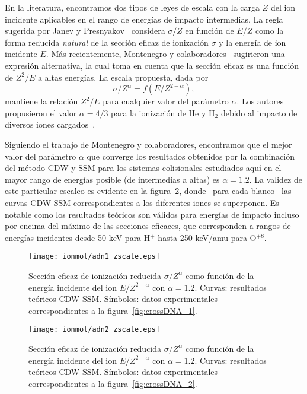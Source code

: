 En la literatura, encontramos dos tipos de leyes de escala con la carga 
$Z$ del ion incidente aplicables en el rango de energías de impacto
intermedias. La regla sugerida por Janev y Presnyakov~\cite{janev1980} 
considera $\sigma/Z$ en función de $E/Z$ como la forma reducida 
\textit{natural} de la sección eficaz de ionización $\sigma$ y la energía
de ion incidente $E$. Más recientemente, Montenegro y 
colaboradores~\cite{dubois2013,montenegro_pra13} sugirieron una expresión
alternativa, la cual toma en cuenta que la sección eficaz es una función
de $Z^2/E$ a altas energías. La escala propuesta, dada por
\begin{equation}
 \sigma/Z^{\alpha}=f(E/Z^{2-\alpha}),
\label{eq:Montenegro}
\end{equation}
mantiene la relación $Z^2/E$ para cualquier valor del parámetro $\alpha$. 
Los autores propusieron el valor $\alpha=4/3$ para la ionización de He y
H$_2$ debido al impacto de diversos iones cargados~\cite{dubois2013}. 

Siguiendo el trabajo de Montenegro y colaboradores, encontramos que el
mejor valor del parámetro $\alpha$ que converge los resultados obtenidos
por la combinación del método CDW y SSM para los sistemas colisionales
estudiados aquí en el mayor rango de energías posible (de intermedias a 
altas) es $\alpha=1.2$. La validez de este particular escaleo es evidente
en la figura~\ref{fig:zreduced}, donde --para cada blanco-- las curvas 
CDW-SSM correspondientes a los diferentes iones se superponen. Es notable
como los resultados teóricos son válidos para energías de impacto incluso
por encima del máximo de las secciones eficaces, que corresponden a
rangos de energías incidentes desde 50 keV para H$^+$ hasta 250 keV/amu 
para O$^{+8}$.

\begin{figure}
\centering
\texttt{[image: ionmol/adn1\_zscale.eps]}
\caption[Sección eficaz de ionización reducida por $Z$ y $\alpha$ 
(Parte I).]
{Sección eficaz de ionización reducida $\sigma/Z^{\alpha}$ como función
de la energía incidente del ion $E/Z^{2-\alpha}$ con $\alpha=1.2$. 
Curvas: resultados teóricos CDW-SSM. 
Símbolos: datos experimentales correspondientes a la 
figura~\ref{fig:crossDNA_1}.}
\label{fig:zreduced}
\end{figure} 

\begin{figure}
\centering
\texttt{[image: ionmol/adn2\_zscale.eps]}
\caption[Sección eficaz de ionización reducida por $Z$ y $\alpha$ 
(Parte II).]
{Sección eficaz de ionización reducida $\sigma/Z^{\alpha}$ como función
de la energía incidente del ion $E/Z^{2-\alpha}$ con $\alpha=1.2$. 
Curvas: resultados teóricos CDW-SSM. 
Símbolos: datos experimentales correspondientes a la 
figura~\ref{fig:crossDNA_2}.}
\label{fig:zreduced}
\end{figure} 


